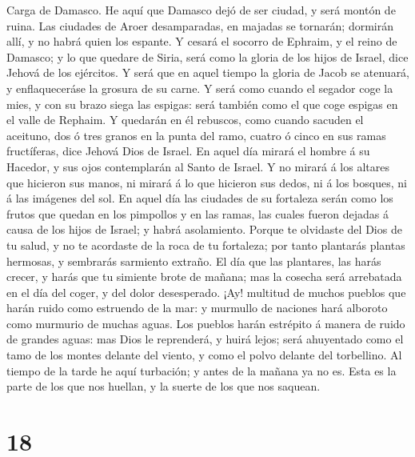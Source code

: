  Carga de Damasco. He aquí que Damasco dejó de ser ciudad, y
será montón de ruina.  Las ciudades de Aroer desamparadas,
en majadas se tornarán; dormirán allí, y no habrá quien los espante.
 Y cesará el socorro de Ephraim, y el reino de Damasco; y lo
que quedare de Siria, será como la gloria de los hijos de Israel, dice
Jehová de los ejércitos.  Y será que en aquel tiempo la
gloria de Jacob se atenuará, y enflaqueceráse la grosura de su carne.
 Y será como cuando el segador coge la mies, y con su brazo
siega las espigas: será también como el que coge espigas en el valle de
Rephaim.  Y quedarán en él rebuscos, como cuando sacuden el
aceituno, dos ó tres granos en la punta del ramo, cuatro ó cinco en sus
ramas fructíferas, dice Jehová Dios de Israel.  En aquel día
mirará el hombre á su Hacedor, y sus ojos contemplarán al Santo de
Israel.  Y no mirará á los altares que hicieron sus manos,
ni mirará á lo que hicieron sus dedos, ni á los bosques, ni á las
imágenes del sol.  En aquel día las ciudades de su fortaleza
serán como los frutos que quedan en los pimpollos y en las ramas, las
cuales fueron dejadas á causa de los hijos de Israel; y habrá
asolamiento.  Porque te olvidaste del Dios de tu salud, y
no te acordaste de la roca de tu fortaleza; por tanto plantarás plantas
hermosas, y sembrarás sarmiento extraño.  El día que las
plantares, las harás crecer, y harás que tu simiente brote de mañana;
mas la cosecha será arrebatada en el día del coger, y del dolor
desesperado.  ¡Ay! multitud de muchos pueblos que harán
ruido como estruendo de la mar: y murmullo de naciones hará alboroto
como murmurio de muchas aguas.  Los pueblos harán estrépito
á manera de ruido de grandes aguas: mas Dios le reprenderá, y huirá
lejos; será ahuyentado como el tamo de los montes delante del viento, y
como el polvo delante del torbellino.  Al tiempo de la
tarde he aquí turbación; y antes de la mañana ya no es. Esta es la parte
de los que nos huellan, y la suerte de los que nos saquean.

\hypertarget{section-17}{%
\section{18}\label{section-17}}

